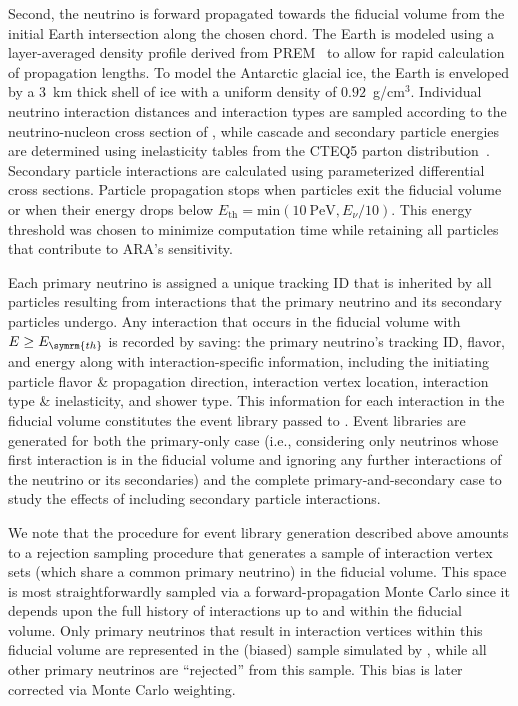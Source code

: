       Second, the neutrino is forward propagated towards the fiducial volume from the initial Earth intersection along the chosen chord.
      The Earth is modeled using a layer-averaged density profile derived from PREM~\citep{prem} to allow for rapid calculation of propagation lengths.
      To model the Antarctic glacial ice, the Earth is enveloped by a 3~km thick shell of ice with a uniform density of $0.92$~g/cm$^3$.
      Individual neutrino interaction distances and interaction types are sampled according to the neutrino-nucleon cross section of \citep{ctw-interaction}, while cascade and secondary particle energies are determined using inelasticity tables from the CTEQ5 parton distribution~\citep{cteq5}.
      Secondary particle interactions are calculated using parameterized differential cross sections.
      Particle propagation stops when particles exit the fiducial volume or when their energy drops below $E_{\text{th}} = \text{min}(10~\text{PeV}, E_{\nu}/10)$.
      This energy threshold was chosen to minimize computation time while retaining all particles that contribute to ARA's sensitivity.
      
      Each primary neutrino is assigned a unique tracking ID that is inherited by all particles resulting from interactions that the primary neutrino and its secondary particles undergo.
      Any interaction that occurs in the fiducial volume with $E \geq E_{\symrm{th}}$ is recorded by saving: the primary neutrino's tracking ID, flavor, and energy along with interaction-specific information, including the initiating particle flavor \& propagation direction, interaction vertex location, interaction type \& inelasticity, and shower type.
      This information for each interaction in the fiducial volume constitutes the event library passed to \arasim{}.
      Event libraries are generated for both the primary-only case (i.e., considering only neutrinos whose first interaction is in the fiducial volume and ignoring any further interactions of the neutrino or its secondaries) and the complete primary-and-secondary case to study the effects of including secondary particle interactions.

      We note that the procedure for event library generation described above amounts to a rejection sampling procedure that generates a sample of interaction vertex sets (which share a common primary neutrino) in the fiducial volume.
      This space is most straightforwardly sampled via a forward-propagation Monte Carlo since it depends upon the full history of interactions up to and within the fiducial volume.
      Only primary neutrinos that result in interaction vertices within this fiducial volume are represented in the (biased) sample simulated by \arasim{}, while all other primary neutrinos are ``rejected'' from this sample.
      This bias is later corrected via Monte Carlo weighting.
      
